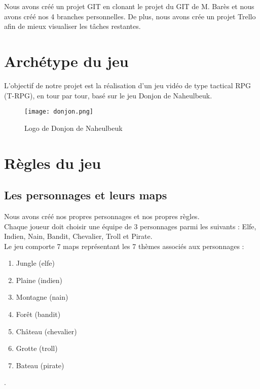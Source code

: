 \documentclass[a4paper,12pt]{report}
\begin{document}
		Nous avons créé un projet GIT en clonant le projet du GIT de M. Barès et nous avons créé nos 4 branches personnelles.
		De plus, nous avons crée un projet Trello afin de mieux visualiser les tâches restantes.
	
	
	
	
	
	\section{Archétype du jeu}
	L'objectif de notre projet est la réalisation d'un jeu vidéo de type tactical RPG (T-RPG), en tour par tour, basé sur le jeu Donjon de Naheulbeuk. 
	
	\begin{figure}[h]
		\centering
		\texttt{[image: donjon.png]}
		\caption{Logo de Donjon de Naheulbeuk}
	\end{figure}
	
	
	
	\section{Règles du jeu}
	
	
	\subsection{Les personnages et leurs maps}
	Nous avons créé nos propres personnages et nos propres règles.\\
	Chaque joueur doit choisir une équipe de 3 personnages parmi les suivants : Elfe, Indien, Nain, Bandit, Chevalier, Troll et Pirate.  \\

	\indent Le jeu comporte 7 maps représentant les 7 thèmes associés aux personnages : 
	\begin{enumerate}
		\item Jungle (elfe)
		\item Plaine (indien)
		\item Montagne (nain)
		\item Forêt (bandit)
		\item Château (chevalier)
		\item Grotte (troll)
		\item Bateau (pirate)
	\end{enumerate}	
	. \\ 
	
	
	
	
	
\end{document}
